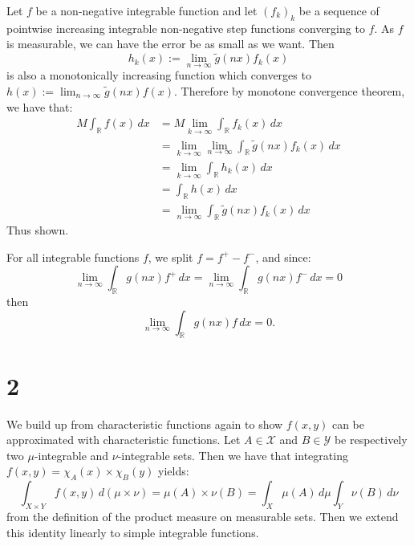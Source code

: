 \documentclass{article}
\theoremstyle{definition}
\numberwithin{theorem}{section}
\numberwithin{equation}{section}
\begin{document}
Let $f$ be a non-negative integrable function and let $\left(  f_k \right)_k$ be a sequence of pointwise increasing integrable non-negative step functions converging to $f$. As $f$ is measurable, we can have the error be as small as we want. Then 
\begin{equation}
	h_k(x) := \lim_{n \rightarrow \infty} \tilde{g}(nx)f_k(x)
\end{equation}
is also a monotonically increasing function which converges to $h(x) := \lim_{n \rightarrow \infty} \tilde{g}(nx) f(x)$. Therefore by monotone convergence theorem, we have that:
\begin{align*}
	M \int_{\mathbb{R}} f(x) \, dx
	&= M \lim_{k \rightarrow \infty} \int_{\mathbb{R}} f_k(x) \, dx\\
	&= \lim_{k \rightarrow \infty} \lim_{n \rightarrow \infty} \int_{\mathbb{R}}  \tilde{g}(nx)f_k(x)\, dx\\
	&= \lim_{k \rightarrow \infty} \int_{\mathbb{R}}  h_k(x) \, dx\\
	&= \int_{\mathbb{R}} h(x) \, dx\\
	&= \lim_{n \rightarrow \infty} \int_{\mathbb{R}} \tilde{g}(nx)f_k(x) \, dx
\end{align*}
Thus shown.

For all integrable functions $f$, we split $f = f^+ - f^-$, and since:
\begin{equation}
	\lim_{n \rightarrow \infty} \int_{\mathbb{R}}  g(nx) f^{+} \, dx = \lim_{n \rightarrow \infty} \int_{\mathbb{R}}  g(nx) f^{-} \, dx = 0
\end{equation}
then 
\begin{equation}
	\lim_{n \rightarrow \infty} \int_{\mathbb{R}}  g(nx) f \, dx = 0.
\end{equation}


\section{2}
We build up from characteristic functions again to show $f(x, y)$ can be approximated with characteristic functions. Let $A \in \mathcal{X}$ and $B \in \mathcal{Y}$ be respectively two $\mu$-integrable and $\nu$-integrable sets. Then we have that integrating $f(x, y) = \chi_A(x) \times \chi_B(y)$ yields:
\begin{equation}
	\int_{X \times Y} f(x, y) \, d(\mu \times \nu) = \mu(A) \times \nu(B) = \int_X \mu(A) \, d\mu \int_Y \nu(B) \, d\nu
\end{equation}
from the definition of the product measure on measurable sets. Then we extend this identity linearly to simple integrable functions.
\end{document}

